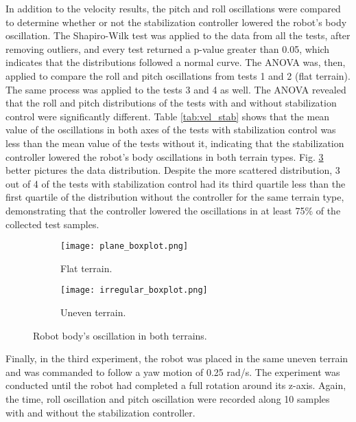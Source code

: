 \documentclass[conference]{IEEEtran}
\begin{document}
In addition to the velocity results, the pitch and roll oscillations were compared to determine whether or not the stabilization controller lowered the robot's body oscillation. The Shapiro-Wilk test was applied to the data from all the tests, after removing outliers, and every test returned a p-value greater than 0.05, which indicates that the distributions followed a normal curve. The ANOVA was, then, applied to compare the roll and pitch oscillations from tests 1 and 2 (flat terrain). The same process was applied to the tests 3 and 4 as well. The ANOVA revealed that the roll and pitch distributions of the tests with and without stabilization control were significantly different. Table \ref{tab:vel_stab} shows that the mean value of the oscillations in both axes of the tests with stabilization control was less than the mean value of the tests without it, indicating that the stabilization controller lowered the robot's body oscillations in both terrain types. Fig. \ref{fig:imu_test} better pictures the data distribution. Despite the more scattered distribution, 3 out of 4 of the tests with stabilization control had its third quartile less than the first quartile of the distribution without the controller for the same terrain type, demonstrating that the controller lowered the oscillations in at least 75\% of the collected test samples.
\vspace{0.1\baselineskip}

\begin{figure}[!tb]
  \centering
  \begin{subfigure}[t]{0.49\textwidth}
    \centering
    \texttt{[image: plane\_boxplot.png]}
    \caption{Flat terrain.}
    \label{fig:imu_test_plane}
  \end{subfigure}
  \begin{subfigure}[t]{0.49\textwidth}
    \centering
    \texttt{[image: irregular\_boxplot.png]}
    \caption{Uneven terrain.}
    \label{fig:imu_test_irregular}
  \end{subfigure}
  \caption{Robot body's oscillation in both terrains.}
  \label{fig:imu_test}
\end{figure}

Finally, in the third experiment, the robot was placed in the same uneven terrain and was commanded to follow a yaw motion of 0.25 rad/s. The experiment was conducted until the robot had completed a full rotation around its z-axis. Again, the time, roll oscillation and pitch oscillation were recorded along 10 samples with and without the stabilization controller. 
\end{document}
